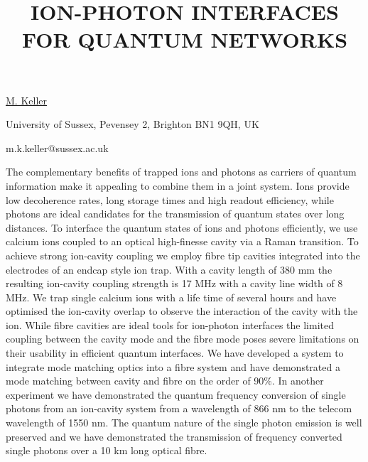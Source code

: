 \title{ION-PHOTON INTERFACES FOR QUANTUM NETWORKS}

\underline{M. Keller} 

{\normalsize{\vspace{-4mm}
University of Sussex,
Pevensey 2,
Brighton BN1 9QH,
UK

\email m.k.keller@sussex.ac.uk}}

The complementary benefits of trapped ions and photons as carriers of quantum information make it appealing to combine them in a joint system. Ions provide low decoherence rates, long storage times and high readout efficiency, while photons are ideal candidates for the transmission of quantum states over long distances. To interface the quantum states of ions and photons efficiently, we use calcium ions coupled to an optical high-finesse cavity via a Raman transition.
To achieve strong ion-cavity coupling we employ fibre tip cavities integrated into the electrodes of an endcap style ion trap. With a cavity length of 380 mm the resulting ion-cavity coupling strength is 17 MHz with a cavity line width of 8 MHz. We trap single calcium ions with a life time of several hours and have optimised the ion-cavity overlap to observe the interaction of the cavity with the ion.
While fibre cavities are ideal tools for ion-photon interfaces the limited coupling between the cavity mode and the fibre mode poses severe limitations on their usability in efficient quantum interfaces. We have developed a system to integrate mode matching optics into a fibre system and have demonstrated a mode matching between cavity and fibre on the order of 90\%.
In another experiment we have demonstrated the quantum frequency conversion of single photons from an ion-cavity system from a wavelength of 866 nm to the telecom wavelength of 1550 nm. The quantum nature of the single photon emission is well preserved and we have demonstrated the transmission of frequency converted single photons over a 10 km long optical fibre.

\vspace{\baselineskip}
